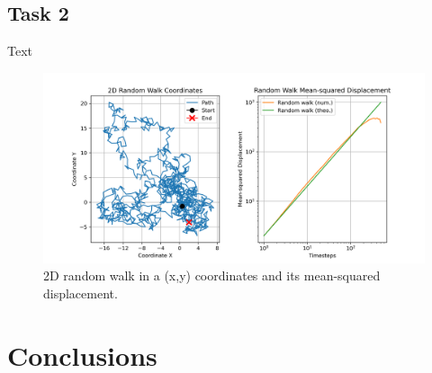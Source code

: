 \documentclass{article}
\begin{document}
\subsection{Task 2}


Text

\begin{figure}[H]
\includegraphics[width=\linewidth]{msd_plot.png}
\caption{2D random walk in a (x,y) coordinates and its mean-squared displacement.}
\label{msd_plot}
\end{figure}



\section{Conclusions}



\end{document}
